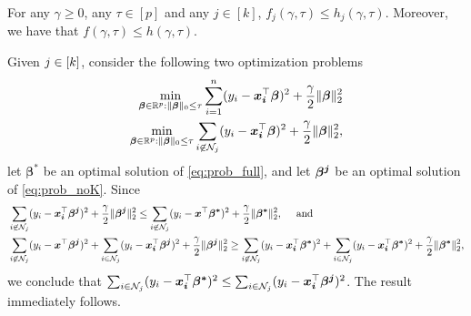 \documentclass[ijoc,noblindrev]{informs3} %
\newcommand{\ag}[1]{{\color{black}#1}}
\begin{document}
\begin{proposition}\label{prop:LB}
For any $\gamma\geq 0$, any $\tau \in[p]$ \ag{and any $j\in [k]$}, $f_j(\gamma,\tau)\leq h_j(\gamma,\tau)$. Moreover, we have that $f(\gamma, \tau) \leq h(\gamma, \tau)$.
\end{proposition}
Given ${\color{black}j}\in [k]$, consider the following two optimization problems
	\begin{align}
		\min_{\bm{\beta}\in \mathbb{R}^p: \Vert \bm{\beta}\Vert_0 \leq \tau}\sum_{i=1}^n(y_i -\bm{x_i}^\top \bm{\beta})^2+\frac{\gamma}{2}\Vert \bm{\beta}\Vert_2^2\label{eq:prob_full}\\
	\min_{\bm{\beta}\in \mathbb{R}^p: \Vert \bm{\beta}\Vert_0 \leq \tau}\sum_{\ag{i \not\in \mathcal{N}_j}}(y_i -\bm{x_i}^\top \bm{\beta})^2+\frac{\gamma}{2}\Vert \bm{\beta}\Vert_2^2,\label{eq:prob_noK}
	\end{align}
let $\bm{\beta^*}$ be an optimal solution of \eqref{eq:prob_full}, and let $\bm{\beta^{\color{black}j}}$ be an optimal solution of \eqref{eq:prob_noK}. Since \begin{align*}&\sum_{\ag{i \not\in \mathcal{N}_j}}(y_i -\bm{x_i}^\top \bm{\beta^{\color{black}j}})^2+\frac{\gamma}{2}\Vert \bm{\beta^{\color{black}j}}\Vert_2^2\leq \sum_{\ag{i \not\in \mathcal{N}_j}}(y_i -\bm{x}^\top \bm{\beta^*})^2+\frac{\gamma}{2}\Vert \bm{\beta^*}\Vert_2^2,\quad \text{ and }\\
&\sum_{\ag{i \not\in \mathcal{N}_j}}(y_i -\bm{x}^\top \bm{\beta^{\color{black}j}})^2+\ag{\sum_{i\in \mathcal{N}_j}}(y_{\color{black}i} -\bm{x_{\color{black}i}}^\top \bm{\beta^{\color{black}j}})^2+\frac{\gamma}{2}\Vert \bm{\beta^{\color{black}j}}\Vert_2^2\geq \sum_{\ag{i \not\in \mathcal{N}_j}}(y_i -\bm{x_i}^\top \bm{\beta^*})^2+\ag{\sum_{i\in \mathcal{N}_j}}(y_{\color{black}i} -\bm{x_{\color{black}i}}^\top \bm{\beta^*})^2+\frac{\gamma}{2}\Vert \bm{\beta^*}\Vert_2^2,
\end{align*}
we conclude that $\ag{\sum_{i\in \mathcal{N}_j}}(y_{\color{black}i} -\bm{x_{\color{black}i}}^\top \bm{\beta^*})^2\leq  \ag{\sum_{i\in \mathcal{N}_j}}(y_{\color{black}i} -\bm{x_{\color{black}i}}^\top \bm{\beta^{\color{black}j}})^2$. The result immediately follows. \Halmos
\endproof


\end{document}
